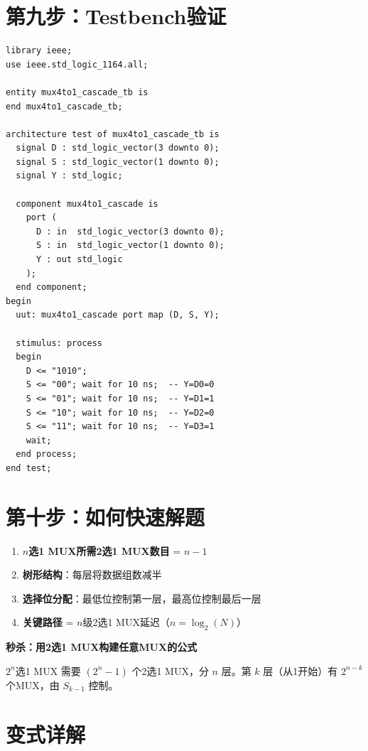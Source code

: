 \section{第九步：Testbench验证}

\begin{lstlisting}[caption={级联MUX Testbench}]
library ieee;
use ieee.std_logic_1164.all;

entity mux4to1_cascade_tb is
end mux4to1_cascade_tb;

architecture test of mux4to1_cascade_tb is
  signal D : std_logic_vector(3 downto 0);
  signal S : std_logic_vector(1 downto 0);
  signal Y : std_logic;

  component mux4to1_cascade is
    port (
      D : in  std_logic_vector(3 downto 0);
      S : in  std_logic_vector(1 downto 0);
      Y : out std_logic
    );
  end component;
begin
  uut: mux4to1_cascade port map (D, S, Y);

  stimulus: process
  begin
    D <= "1010";
    S <= "00"; wait for 10 ns;  -- Y=D0=0
    S <= "01"; wait for 10 ns;  -- Y=D1=1
    S <= "10"; wait for 10 ns;  -- Y=D2=0
    S <= "11"; wait for 10 ns;  -- Y=D3=1
    wait;
  end process;
end test;
\end{lstlisting}

\section{第十步：如何快速解题}

\begin{examtip}[级联MUX快速解题法]
\begin{enumerate}
  \item \textbf{$n$选1 MUX所需2选1 MUX数目} = $n-1$
  \item \textbf{树形结构}：每层将数据组数减半
  \item \textbf{选择位分配}：最低位控制第一层，最高位控制最后一层
  \item \textbf{关键路径} = $n$级2选1 MUX延迟（$n = \log_2(N)$）
\end{enumerate}
\end{examtip}

\textbf{秒杀：用2选1 MUX构建任意MUX的公式}

$2^n$选1 MUX 需要 $(2^n - 1)$ 个2选1 MUX，分 $n$ 层。第 $k$ 层（从1开始）有 $2^{n-k}$ 个MUX，由 $S_{k-1}$ 控制。

\section{变式详解}
